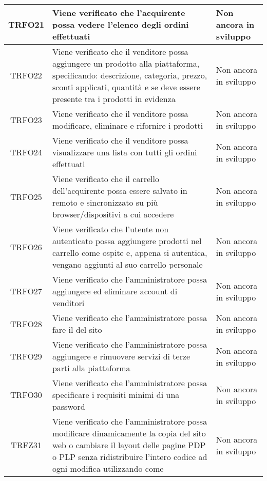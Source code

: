 \begin{longtable}{|c| C{10cm} |C{3cm}|}
	TRFO21 & Viene verificato che l'acquirente possa vedere l'elenco degli ordini effettuati & Non ancora in sviluppo\\ \hline
	TRFO22 & Viene verificato che il venditore possa aggiungere un prodotto alla piattaforma, specificando: descrizione, categoria, prezzo, sconti applicati, quantità e se deve essere presente tra i prodotti in evidenza & Non ancora in sviluppo\\ \hline
    TRFO23 & Viene verificato che il venditore possa modificare, eliminare e rifornire i prodotti & Non ancora in sviluppo\\ \hline
    TRFO24 & Viene verificato che il venditore possa visualizzare una lista con tutti gli ordini effettuati & Non ancora in sviluppo\\ \hline
    TRFO25 & Viene verificato che il carrello dell'acquirente possa essere salvato in remoto e sincronizzato su più browser/dispositivi a cui accedere & Non ancora in sviluppo\\ \hline
    TRFO26 & Viene verificato che l'utente non autenticato possa aggiungere prodotti nel carrello come ospite e, appena si autentica, vengano aggiunti al suo carrello personale & Non ancora in sviluppo\\ \hline
    TRFO27 & Viene verificato che l'amministratore possa aggiungere ed eliminare account di venditori & Non ancora in sviluppo\\ \hline
    TRFO28 & Viene verificato che l'amministratore possa fare il  del sito & Non ancora in sviluppo\\ \hline
    TRFO29 & Viene verificato che l'amministratore possa aggiungere e rimuovere servizi di terze parti alla piattaforma & Non ancora in sviluppo\\ \hline
    TRFO30 & Viene verificato che l'amministratore possa specificare i requisiti minimi di una password & Non ancora in sviluppo\\ \hline
    TRFZ31 & Viene verificato che l'amministratore possa modificare dinamicamente la copia del sito web o cambiare il layout delle pagine PDP o PLP senza ridistribuire l'intero codice ad ogni modifica utilizzando  come  & Non ancora in sviluppo\\ \hline
\end{longtable}
